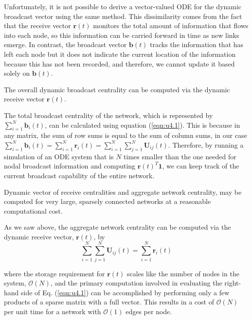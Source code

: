 Unfortunately, it is not possible to derive a vector-valued ODE for the dynamic broadcast vector using the same method. This dissimilarity comes from the fact that the receive vector $\mathbf{r}(t)$ monitors the total amount of information that flows into each node, so this information can be carried forward in time as new links emerge. In contrast, the broadcast vector $\mathbf{b}(t)$ tracks the information that has left each node but it does not indicate the current location of the information because this has not been recorded, and therefore, we cannot update it based solely on $\mathbf{b}(t)$.

\begin{highlightedParagraphC}
 
The overall dynamic broadcast centrality can be computed via the dynamic receive vector $\mathbf{r}(t)$.

\end{highlightedParagraphC}

The total broadcast centrality of the network, which is represented by $\sum_{i=1}^{N} \mathbf{b}_i(t)$, can be calculated using equation (\ref{eqn:u4.1}). This is because in any matrix, the sum of row sums is equal to the sum of column sums, in our case $\sum_{i=1}^{N} \mathbf{b}_i(t) = \sum_{i=1}^{N} \mathbf{r}_i(t)=\sum_{i=1}^{N}\sum_{j=1}^{N} \mathbf{U}_{ij}(t)$. Therefore, by running a simulation of an ODE system that is $N$ times smaller than the one needed for nodal broadcast information and computing $\mathbf{r}(t)^T\mathbf{1}$, we can keep track of the current broadcast capability of the entire network.

\begin{highlightedParagraphC}
 
 Dynamic vector of receive centralities and aggregate network centrality, may be computed for very large, sparsely connected networks at a reasonable computational cost. 

\end{highlightedParagraphC}

As we saw above, the aggregate network centrality can be computed via the dynamic receive vector, $\mathbf{r}(t)$, by $$\sum_{i=1}^{N}\sum_{j=1}^{N} \mathbf{U}_{ij}(t) = \sum_{i=1}^{N} \mathbf{r}_i(t)$$

where the storage requirement for $\mathbf{r}(t)$ scales like the number of nodes in the system, $\mathcal{O}(N)$, and the primary computation involved in evaluating the right-hand side of Eq. (\ref{eqn:u4.1}) can be accomplished by performing only a few products of a sparse matrix with a full vector. This results in a cost of $\mathcal{O}(N)$ per unit time for a network with $\mathcal{O}(1)$ edges per node.

